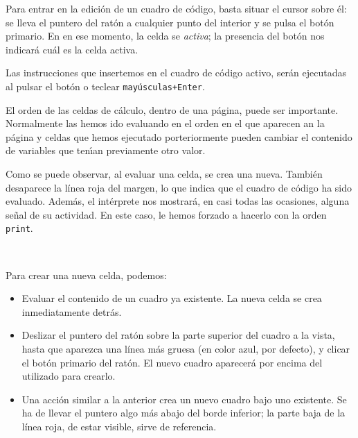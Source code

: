 \noindent\begin{minipage}{1\textwidth}
\indentar Para entrar en la edición de un cuadro de código, basta
situar el cursor sobre él: se lleva el puntero del ratón a cualquier punto del
interior y se pulsa el botón primario. En en ese momento, la celda se
\emph{activa}; la presencia del botón  nos indicará cuál es la
celda activa.
          
\end{minipage}



\noindent\begin{minipage}{1\textwidth}
Las instrucciones que insertemos en el cuadro de código activo, serán
ejecutadas al pulsar el botón  o teclear
\texttt{mayúsculas+Enter}. 

\end{minipage}

El orden de las celdas de c\'alculo, dentro de una p\'agina, puede ser
importante. Normalmente las hemos ido evaluando en el orden en el que aparecen
an la p\'agina y celdas que hemos ejecutado porteriormente pueden cambiar el
contenido de variables que ten\'{\i}an previamente otro valor. 

Como se puede observar, al evaluar una celda, se crea una nueva.
También
desaparece la línea roja del margen, lo que indica que el cuadro de código ha
sido evaluado. Además, el intérprete nos mostrará, en casi todas las ocasiones,
alguna señal de su actividad. En este caso, le hemos forzado a hacerlo con la
orden \lstinline|print|.

\

\pagebreak[3]

\noindent\begin{minipage}{1\textwidth}
Para crear una nueva celda, podemos:
\begin{itemize}
 \item Evaluar el contenido de un cuadro ya existente. La nueva celda se crea
inmediatamente detrás.

\item Deslizar el puntero del ratón sobre la parte superior del
cuadro a la vista, hasta que aparezca una línea más gruesa (en color azul, por
defecto), y clicar el botón primario del ratón. El nuevo cuadro aparecerá por
encima del utilizado para crearlo.


\item Una acción similar a la anterior crea un nuevo cuadro  bajo uno
existente.
Se ha de llevar el puntero algo más abajo del borde inferior; la parte baja
de la línea roja, de estar visible, sirve de referencia.

\end{itemize}
\end{minipage}


